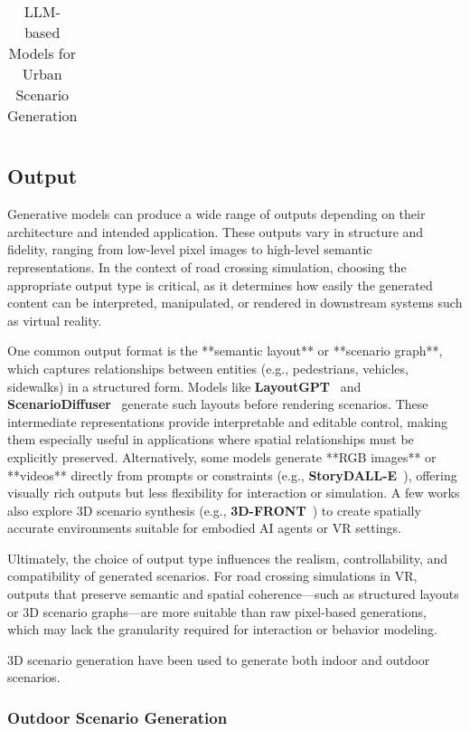 \documentclass{article}
\begin{document}
\begin{table}[ht]
\begin{table}[ht]
\begin{tabular}{|c|c|c|}
    \end{tabular}
    \caption{LLM-based Models for Urban Scenario Generation}
    \label{tab:llm_based_models}
\end{table}

\subsection{Output}

Generative models can produce a wide range of outputs depending on their architecture and intended application. These outputs vary in structure and fidelity, ranging from low-level pixel images to high-level semantic representations. In the context of road crossing simulation, choosing the appropriate output type is critical, as it determines how easily the generated content can be interpreted, manipulated, or rendered in downstream systems such as virtual reality.

One common output format is the **semantic layout** or **scenario graph**, which captures relationships between entities (e.g., pedestrians, vehicles, sidewalks) in a structured form. Models like \textbf{LayoutGPT}~\cite{feng2023layoutgpt} and \textbf{ScenarioDiffuser}~\cite{yang2023scenariodiffuser} generate such layouts before rendering scenarios. These intermediate representations provide interpretable and editable control, making them especially useful in applications where spatial relationships must be explicitly preserved. Alternatively, some models generate **RGB images** or **videos** directly from prompts or constraints (e.g., \textbf{StoryDALL-E}~\cite{storydalle}), offering visually rich outputs but less flexibility for interaction or simulation. A few works also explore 3D scenario synthesis (e.g., \textbf{3D-FRONT}~\cite{fu20213dfront}) to create spatially accurate environments suitable for embodied AI agents or VR settings.

Ultimately, the choice of output type influences the realism, controllability, and compatibility of generated scenarios. For road crossing simulations in VR, outputs that preserve semantic and spatial coherence—such as structured layouts or 3D scenario graphs—are more suitable than raw pixel-based generations, which may lack the granularity required for interaction or behavior modeling.


3D scenario generation have been used to generate both indoor and outdoor scenarios.


\subsubsection{Outdoor Scenario Generation}


\end{table}
\end{document}
